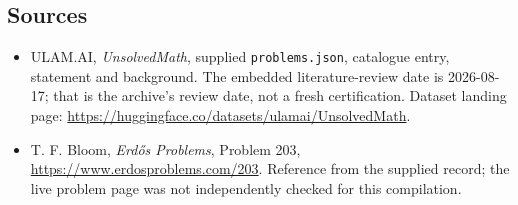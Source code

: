 \documentclass[11pt,a4paper]{article}
\begin{document}
\subsection{Sources}

{\small

\begin{itemize}

\item[\hypertarget{source:statement:1}{S1}] ULAM.AI, \emph{UnsolvedMath}, supplied \texttt{problems.json}, catalogue entry, statement and background. The embedded literature-review date is 2026-08-17; that is the archive’s review date, not a fresh certification. Dataset landing page: \url{https://huggingface.co/datasets/ulamai/UnsolvedMath}.

\item[\hypertarget{source:statement:2}{S2}] T. F. Bloom, \emph{Erdős Problems}, Problem 203, \url{https://www.erdosproblems.com/203}. Reference from the supplied record; the live problem page was not independently checked for this compilation.

\end{itemize}

}

\label{end:statement}
\end{document}

